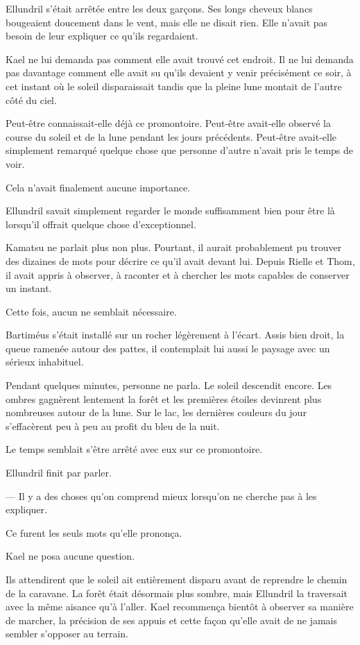 Ellundril s'était arrêtée entre les deux garçons. Ses longs cheveux blancs
bougeaient doucement dans le vent, mais elle ne disait rien. Elle n'avait pas
besoin de leur expliquer ce qu'ils regardaient.

Kael ne lui demanda pas comment elle avait trouvé cet endroit. Il ne lui
demanda pas davantage comment elle avait su qu'ils devaient y venir
précisément ce soir, à cet instant où le soleil disparaissait tandis que la
pleine lune montait de l'autre côté du ciel.

Peut-être connaissait-elle déjà ce promontoire. Peut-être avait-elle observé la
course du soleil et de la lune pendant les jours précédents. Peut-être
avait-elle simplement remarqué quelque chose que personne d'autre n'avait pris
le temps de voir.

Cela n'avait finalement aucune importance.

Ellundril savait simplement regarder le monde suffisamment bien pour être là
lorsqu'il offrait quelque chose d'exceptionnel.

Kamatsu ne parlait plus non plus. Pourtant, il aurait probablement pu trouver
des dizaines de mots pour décrire ce qu'il avait devant lui. Depuis Rielle et
Thom, il avait appris à observer, à raconter et à chercher les mots capables de
conserver un instant.

Cette fois, aucun ne semblait nécessaire.

Bartiméus s'était installé sur un rocher légèrement à l'écart. Assis bien
droit, la queue ramenée autour des pattes, il contemplait lui aussi le paysage
avec un sérieux inhabituel.

Pendant quelques minutes, personne ne parla. Le soleil descendit encore. Les
ombres gagnèrent lentement la forêt et les premières étoiles devinrent plus
nombreuses autour de la lune. Sur le lac, les dernières couleurs du jour
s'effacèrent peu à peu au profit du bleu de la nuit.

Le temps semblait s'être arrêté avec eux sur ce promontoire.

Ellundril finit par parler.

— Il y a des choses qu'on comprend mieux lorsqu'on ne cherche pas à les
expliquer.

Ce furent les seuls mots qu'elle prononça.

Kael ne posa aucune question.

\scenebreak

Ils attendirent que le soleil ait entièrement disparu avant de reprendre le
chemin de la caravane. La forêt était désormais plus sombre, mais Ellundril la
traversait avec la même aisance qu'à l'aller. Kael recommença bientôt à
observer sa manière de marcher, la précision de ses appuis et cette façon
qu'elle avait de ne jamais sembler s'opposer au terrain.


